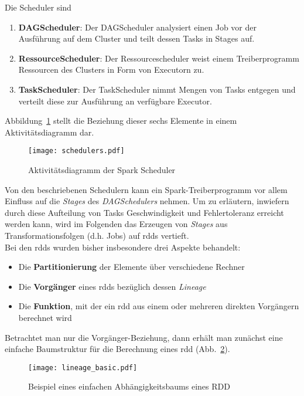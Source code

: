 Die Scheduler sind
\begin{enumerate}
	\item \textbf{DAGScheduler}: Der DAGScheduler analysiert einen Job vor der Ausführung auf dem Cluster und teilt dessen Tasks in Stages auf.
	\item \textbf{RessourceScheduler}: Der Ressourcescheduler weist einem Treiberprogramm Ressourcen des Clusters in Form von Executorn zu.
	\item \textbf{TaskScheduler}: Der TaskScheduler nimmt Mengen von Tasks entgegen und verteilt diese zur Ausführung an verfügbare Executor.
\end{enumerate}

Abbildung~\ref{fig:schedulers} stellt die Beziehung dieser sechs Elemente in einem Aktivitätsdiagramm dar.

\begin{figure}[ht!]
	\centering
  \texttt{[image: schedulers.pdf]}
	\caption{Aktivitätsdiagramm der Spark Scheduler}
	\label{fig:schedulers}
\end{figure}

Von den beschriebenen Schedulern kann ein Spark-Treiberprogramm vor allem Einfluss auf die \textit{Stages} des \textit{DAGSchedulers} nehmen.
Um zu erläutern, inwiefern durch diese Aufteilung von Tasks Geschwindigkeit und Fehlertoleranz erreicht werden kann, wird im Folgenden das Erzeugen von \textit{Stages} aus Transformationsfolgen (d.h. Jobs) auf \gls{rdd}s vertieft.\\

Bei den \glspl{rdd} wurden bisher insbesondere drei Aspekte behandelt:
\begin{itemize}
	\item Die \textbf{Partitionierung} der Elemente über verschiedene Rechner
	\item Die \textbf{Vorgänger} eines \gls{rdd}s bezüglich dessen \textit{Lineage}
	\item Die \textbf{Funktion}, mit der ein \gls{rdd} aus einem oder mehreren direkten Vorgängern berechnet wird
\end{itemize}

Betrachtet man nur die Vorgänger-Beziehung, dann erhält man zunächst eine einfache Baumstruktur für die Berechnung eines \gls{rdd} (Abb.~\ref{fig:lineage_basic}).\\

\begin{figure}[ht!]
	\centering
  \texttt{[image: lineage\_basic.pdf]}
	\caption{Beispiel eines einfachen Abhängigkeitsbaums eines RDD}
	\label{fig:lineage_basic}
\end{figure}

